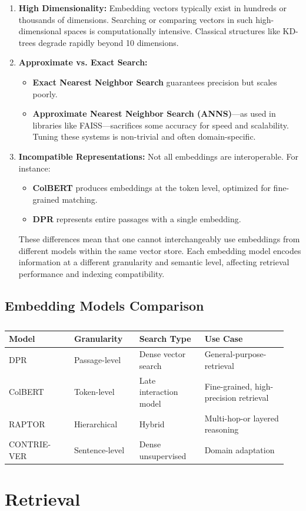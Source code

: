 \documentclass[twocolumn, 10pt]{article}
\begin{document}
\begin{enumerate}
    \item \textbf{High Dimensionality:} Embedding vectors typically exist in hundreds or thousands of dimensions. Searching or comparing vectors in such high-dimensional spaces is computationally intensive. Classical structures like KD-trees degrade rapidly beyond 10 dimensions.
    
    \item \textbf{Approximate vs. Exact Search:}
    \begin{itemize}
        \item \textbf{Exact Nearest Neighbor Search} guarantees precision but scales poorly.
        \item \textbf{Approximate Nearest Neighbor Search (ANNS)}—as used in libraries like FAISS—sacrifices some accuracy for speed and scalability. Tuning these systems is non-trivial and often domain-specific.
    \end{itemize}
    
    \item \textbf{Incompatible Representations:} 
    Not all embeddings are interoperable. For instance:
    \begin{itemize}
        \item \textbf{ColBERT} produces embeddings at the token level, optimized for fine-grained matching.
        \item \textbf{DPR} represents entire passages with a single embedding.
    \end{itemize}
    These differences mean that one cannot interchangeably use embeddings from different models within the same vector store. Each embedding model encodes information at a different granularity and semantic level, affecting retrieval performance and indexing compatibility.
\end{enumerate}

\subsection*{Embedding Models Comparison}

\begin{table}[H]
\centering
\begin{tabular}{|p{0.22\linewidth}|p{0.22\linewidth}|p{0.22\linewidth}|p{0.28\linewidth}|}
\hline
\textbf{Model} & \textbf{Granularity} & \textbf{Search Type} & \textbf{Use Case} \\
\hline
DPR & Passage-level & Dense vector search& General-purpose-retrieval \\
\hline
ColBERT & Token-level & Late interaction model& Fine-grained, high-precision retrieval \\
\hline
RAPTOR & Hierarchical & Hybrid & Multi-hop-or layered reasoning \\
\hline
CONTRIE-VER & Sentence-level & Dense unsupervised & Domain adaptation \\
\hline
\end{tabular}
\caption{}
\label{tab:embedding-models}
\end{table}


\section{Retrieval}
\end{document}
